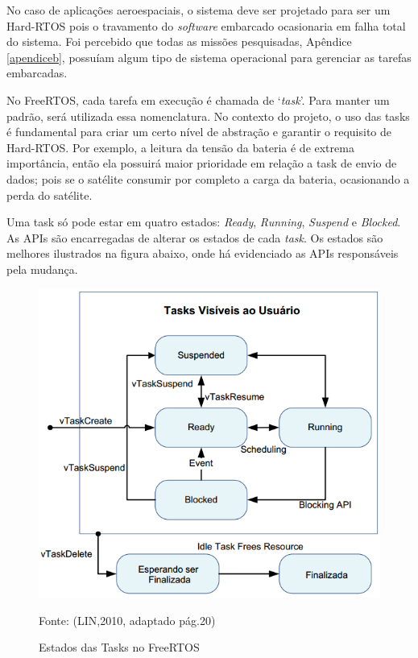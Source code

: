 No caso de aplicações aeroespaciais, o sistema deve ser projetado para ser um Hard-RTOS pois o travamento do \textit{software} embarcado ocasionaria em falha total do sistema. Foi percebido que todas as missões pesquisadas, Apêndice \ref{apendiceb}, possuíam algum tipo de sistema operacional para gerenciar as tarefas embarcadas.

No FreeRTOS, cada tarefa em execução é chamada de ‘\textit{task}’. Para manter um padrão, será utilizada essa nomenclatura. No contexto do projeto, o uso das tasks é fundamental para criar um certo nível de abstração e garantir o requisito de Hard-RTOS. Por exemplo, a leitura da tensão da bateria é de extrema importância, então ela possuirá maior prioridade em relação a task de envio de dados; pois se o satélite consumir por completo a carga da bateria, ocasionando a perda do satélite.

Uma task só pode estar em quatro estados: \textit{Ready}, \textit{Running}, \textit{Suspend} e \textit{Blocked}. As APIs são encarregadas de alterar os estados de cada \textit{task}. Os estados são melhores ilustrados na figura abaixo, onde há evidenciado as APIs responsáveis pela mudança.

\begin{figure}[h]
	\centering
	\caption{Estados das Tasks no FreeRTOS}
	 \includegraphics[keepaspectratio=true,scale=0.8]{figuras/freertosTasks.PNG}
	 
	 Fonte: (LIN,2010, adaptado pág.20)
	
	\label{fig23}
\end{figure}

